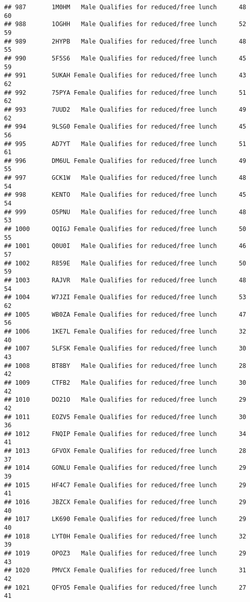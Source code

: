 \documentclass[
]{article}
\begin{document}
\begin{verbatim}
## 987       1M0HM   Male Qualifies for reduced/free lunch      48       60
## 988       1OGHH   Male Qualifies for reduced/free lunch      52       59
## 989       2HYPB   Male Qualifies for reduced/free lunch      48       55
## 990       5F5S6   Male Qualifies for reduced/free lunch      45       59
## 991       5UKAH Female Qualifies for reduced/free lunch      43       62
## 992       75PYA Female Qualifies for reduced/free lunch      51       62
## 993       7UUD2   Male Qualifies for reduced/free lunch      49       62
## 994       9LSG0 Female Qualifies for reduced/free lunch      45       56
## 995       AD7YT   Male Qualifies for reduced/free lunch      51       61
## 996       DM6UL Female Qualifies for reduced/free lunch      49       55
## 997       GCK1W   Male Qualifies for reduced/free lunch      48       54
## 998       KENTO   Male Qualifies for reduced/free lunch      45       54
## 999       O5PNU   Male Qualifies for reduced/free lunch      48       53
## 1000      OQIGJ Female Qualifies for reduced/free lunch      50       55
## 1001      Q0U0I   Male Qualifies for reduced/free lunch      46       57
## 1002      R859E   Male Qualifies for reduced/free lunch      50       59
## 1003      RAJVR   Male Qualifies for reduced/free lunch      48       54
## 1004      W7JZI Female Qualifies for reduced/free lunch      53       62
## 1005      WB0ZA Female Qualifies for reduced/free lunch      47       56
## 1006      1KE7L Female Qualifies for reduced/free lunch      32       40
## 1007      5LFSK Female Qualifies for reduced/free lunch      30       43
## 1008      BT8BY   Male Qualifies for reduced/free lunch      28       42
## 1009      CTFB2   Male Qualifies for reduced/free lunch      30       42
## 1010      DO21O   Male Qualifies for reduced/free lunch      29       42
## 1011      EOZV5 Female Qualifies for reduced/free lunch      30       36
## 1012      FNQIP Female Qualifies for reduced/free lunch      34       41
## 1013      GFVOX Female Qualifies for reduced/free lunch      28       37
## 1014      GONLU Female Qualifies for reduced/free lunch      29       39
## 1015      HF4C7 Female Qualifies for reduced/free lunch      29       41
## 1016      JBZCX Female Qualifies for reduced/free lunch      29       40
## 1017      LK690 Female Qualifies for reduced/free lunch      29       40
## 1018      LYT0H Female Qualifies for reduced/free lunch      32       39
## 1019      OPOZ3   Male Qualifies for reduced/free lunch      29       43
## 1020      PMVCX Female Qualifies for reduced/free lunch      31       42
## 1021      QFYO5 Female Qualifies for reduced/free lunch      27       41

\end{verbatim}
\end{document}
